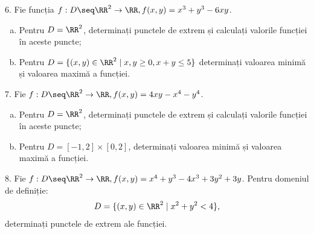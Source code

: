 6. Fie funcția $ f : D \seq \RR^2 \to \RR, f(x, y) = x^3 + y^3 - 6xy $.
\begin{enumerate}[(a)]
\item Pentru $ D = \RR^2 $, determinați punctele de extrem și calculați
  valorile funcției în aceste puncte;
\item Pentru $ D = \{ (x, y) \in \RR^2 \mid x, y \geq 0, x + y \leq 5 \} $
  determinați valoarea minimă și valoarea maximă a funcției.
\end{enumerate}

7. Fie $ f : D \seq \RR^2 \to \RR, f(x, y) = 4xy - x^4 - y^4 $.
\begin{enumerate}[(a)]
\item Pentru $ D = \RR^2 $, determinați punctele de extrem și calculați valorile
  funcției în aceste puncte;
\item Pentru $ D = [-1, 2] \times [0, 2] $, determinați valoarea minimă
  și valoarea maximă a funcției.
\end{enumerate}

8. Fie $ f : D \seq \RR^2 \to \RR, f(x, y) = x^4 + y^3 - 4x^3 + 3y^2 + 3y $.
Pentru domeniul de definiție:
\[
  D = \{(x, y) \in \RR^2 \mid x^2 + y^2 < 4 \},
\]
determinați punctele de extrem ale funcției.

